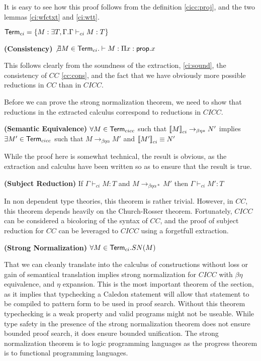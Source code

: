 It is easy to see how this proof follows from the 
definition \ref{cicc:proj}, and the two lemmas \ref{ci:wfctxt} and \ref{ci:wtt}.

\begin{definition}
$ \mathsf{Term}_{ci}  = \{ M : \exists T,\Gamma . \Gamma \vdash_{ci} M : T \}$
\end{definition}

\begin{theorem}
\textbf{(Consistency)}  $\not \exists M \in \mathsf{Term}_{ci}. \vdash M : \Pi x : \mathsf{prop} . x$
\label{ci:cons}
\end{theorem}

This follows clearly from the soundness of the extraction, 
\ref{ci:sound}, the consistency of $CC$ \ref{cc:cons}, and the fact that we 
have obviously more possible reductions in $CC$ than in $CICC$.  

Before we can prove the strong normalization theorem, we need to show that reductions in the extracted calculus 
correspond to reductions in $CICC$. 

\begin{theorem}
\textbf{(Semantic Equivalence)} 
$\forall M \in \mathsf{Term}_{cicc}$ such that $\left\llbracket M \right\rrbracket_{ci} \rightarrow_{\beta\eta*} N'$
implies 
$\exists M' \in \mathsf{Term}_{cicc}$ such that $M \rightarrow_{\beta\eta\alpha} M'$ and $\left\llbracket M' \right\rrbracket_{ci} \equiv N'$
\label{ci:se}
\end{theorem}

While the proof here is somewhat technical, the result is obvious, as the extraction and calculus
have been written so as to ensure that the result is true.

\begin{theorem}
\textbf{(Subject Reduction)} If $\Gamma \vdash_{ci} M : T$ and $M \rightarrow_{\beta\eta\alpha*} M'$ then $\Gamma \vdash_{ci} M' : T$
\end{theorem}

In non dependent type theories, this theorem is rather trivial.  However, in $CC$, this theorem depends heavily on the Church-Rosser 
theorem.  Fortunately, $CICC$ can be considered a bicoloring of the syntax of $CC$, and the proof of subject reduction 
for $CC$ can be leveraged to $CICC$ using a forgetfull extraction.

\begin{theorem}
\textbf{(Strong Normalization)} $\forall M \in \mathsf{Term}_{ci}. SN(M)$
\label{ci:sn}
\end{theorem}

That we can cleanly translate into the calculus of constructions without loss or gain of 
semantical translation implies strong normalization for $CICC$ with $\beta\eta$ equivalence, 
and $\eta$ expansion.  This is the most important theorem of the section, as it implies that typchecking a Caledon 
statement will allow that statement to be compiled to pattern form to be used in proof search.  
Without this theorem typechecking is a weak property and valid programs might not be useable.  
While type safety in the presence of the strong normalization theorem does not ensure bounded proof search, 
it does ensure bounded unification.
The strong normalization theorem is to logic programming languages as 
the progress theorem is to functional programming languages.

